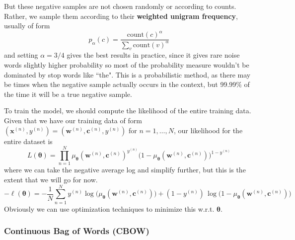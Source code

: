 \documentclass{article}
\begin{document}
      But these negative samples are not chosen randomly or according to counts. Rather, we sample them according to their \textbf{weighted unigram frequency}, usually of form 
      \begin{equation}
        p_\alpha (c) = \frac{\mathrm{count}(c)^\alpha}{\sum_v \mathrm{count}(v)^\alpha}
      \end{equation}
      and setting $\alpha = 3/4$ gives the best results in practice, since it gives rare noise words slightly higher probability so most of the probability measure wouldn't be dominated by stop words like ``the". This is a probabilistic method, as there may be times when the negative sample actually occurs in the context, but 99.99\% of the time it will be a true negative sample. 

      To train the model, we should compute the likelihood of the entire training data. Given that we have our training data of form $(\mathbf{x}^{(n)}, y^{(n)}) = (\mathbf{w}^{(n)}, \mathbf{c}^{(n)}, y^{(n)})$ for $n = 1, \ldots, N$, our likelihood for the entire dataset is 
      \begin{equation}
        L(\boldsymbol{\theta}) = \prod_{n=1}^N \mu_{\boldsymbol{\theta}} (\mathbf{w}^{(n)}, \mathbf{c}^{(n)})^{y^{(n)}} \big( 1 - \mu_{\boldsymbol{\theta}} (\mathbf{w}^{(n)}, \mathbf{c}^{(n)}) \big)^{1 - y^{(n)}}
      \end{equation}
      where we can take the negative average log and simplify further, but this is the extent that we will go for now. 
      \begin{equation}
        - \ell (\boldsymbol{\theta}) = - \frac{1}{N} \sum_{n=1}^N y^{(n)} \log \big( \mu_{\boldsymbol{\theta}} (\mathbf{w}^{(n)}, \mathbf{c}^{(n)}) \big) + (1 - y^{(n)}) \, \log \big( 1 - \mu_{\boldsymbol{\theta}} (\mathbf{w}^{(n)} , \mathbf{c}^{(n)}) \big)
      \end{equation}
      Obviously we can use optimization techniques to minimize this w.r.t. $\boldsymbol{\theta}$. 

    \subsubsection{Continuous Bag of Words (CBOW)}
\end{document}
